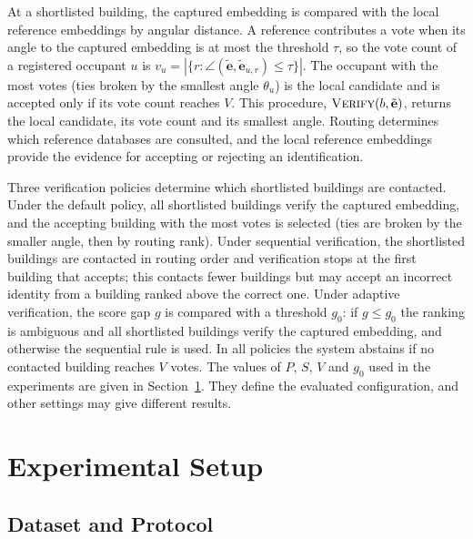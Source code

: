 \documentclass[pdflatex,sn-mathphys-num]{sn-jnl}%
\theoremstyle{thmstyleone}%
\theoremstyle{thmstyletwo}%
\theoremstyle{thmstylethree}%
\begin{document}
At a shortlisted building, the captured embedding is compared with the local reference embeddings by angular distance. A reference contributes a vote when its angle to the captured embedding is at most the threshold $\tau$, so the vote count of a registered occupant $u$ is $v_u=|\{r:\angle(\tilde{\mathbf{e}},\tilde{\mathbf{e}}_{u,r})\leq\tau\}|$. The occupant with the most votes (ties broken by the smallest angle $\theta_u$) is the local candidate and is accepted only if its vote count reaches $V$. This procedure, $\textsc{Verify}(b,\tilde{\mathbf{e}})$, returns the local candidate, its vote count and its smallest angle. Routing determines which reference databases are consulted, and the local reference embeddings provide the evidence for accepting or rejecting an identification.

Three verification policies determine which shortlisted buildings are contacted. Under the default policy, all shortlisted buildings verify the captured embedding, and the accepting building with the most votes is selected (ties are broken by the smaller angle, then by routing rank). Under sequential verification, the shortlisted buildings are contacted in routing order and verification stops at the first building that accepts; this contacts fewer buildings but may accept an incorrect identity from a building ranked above the correct one. Under adaptive verification, the score gap $g$ is compared with a threshold $g_0$: if $g\le g_0$ the ranking is ambiguous and all shortlisted buildings verify the captured embedding, and otherwise the sequential rule is used. In all policies the system abstains if no contacted building reaches $V$ votes. The values of $P$, $S$, $V$ and $g_0$ used in the experiments are given in Section~\ref{sec:setup}. They define the evaluated configuration, and other settings may give different results.


\section{Experimental Setup}
\label{sec:setup}

\subsection{Dataset and Protocol}
\end{document}
